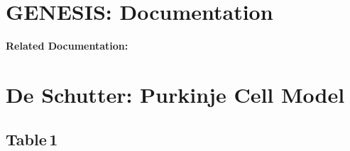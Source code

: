 \documentclass[12pt]{article}
\begin{document}
\section*{GENESIS: Documentation}

{\bf Related Documentation:}

\section*{De Schutter: Purkinje Cell Model}

\subsection*{Table\,1}
\end{document}
